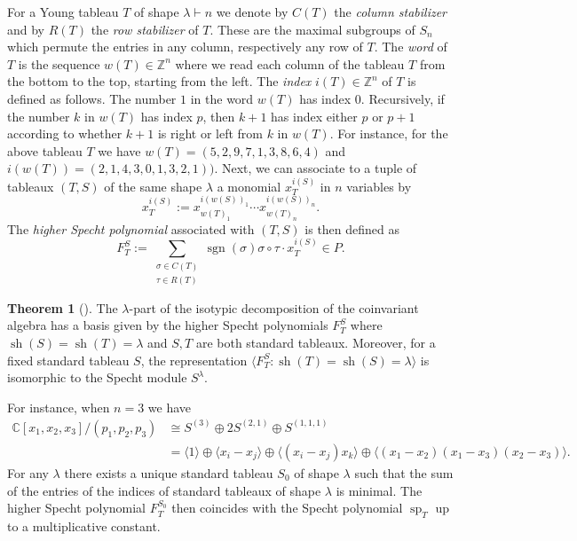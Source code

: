 \documentclass[11pt]{amsart}
\theoremstyle{definition}
\newtheorem{theorem}{Theorem}[section]
\newcommand{\ZZ}{\mathbb{Z}}
\newcommand{\CC}{\mathbb{C}}
\DeclareMathOperator{\sh}{sh}
\DeclareMathOperator{\spe}{sp}
\DeclareMathOperator{\sgn}{sgn}
\begin{document}
For a Young tableau $T$ of shape $\lambda \vdash n$ we denote by $C(T)$ the \emph{column stabilizer} and by $R(T)$ the \emph{row stabilizer} of $T$. These are the maximal subgroups of $S_n$ which permute the entries in any column, respectively any row of $T$. 
The \emph{word} of $T$ is the sequence $w(T) \in \ZZ^n$ where we read each column of the tableau $T$ from the bottom to the top, starting from the left.
The \emph{index} $i(T) \in \ZZ^n$ of $T$ is defined as follows. The number $1$ in the word $w(T)$ has index $0$. Recursively, if the number $k$ in $w(T)$ has index $p$, then $k+1$ has index either $p$ or $p+1$ according to whether $k+1$ is right or left from $k$ in $w(T)$. For instance, for the above tableau $T$ we have $w(T)=(5,2,9,7,1,3,8,6,4)$ and $i(w(T))=(2,1,4,3,0,1,3,2,1))$.
Next, we can associate to a tuple of tableaux $(T,S)$ of the same shape $\lambda$ a monomial $x_T^{i(S)}$ in $n$ variables by
\begin{equation*}
    x_T^{i(S)} := x_{w(T)_1}^{i(w(S))_1} \cdots x_{w(T)_{n}}^{i(w(S))_{n}}.
\end{equation*}
The \emph{higher Specht polynomial} associated with $(T,S)$ is then defined as
$$F_{T}^S := \sum_{\substack{\sigma \in C(T)\\ \tau \in R(T)}} \sgn (\sigma) \sigma \circ \tau \cdot x_{T}^{i(S)} \in P.$$


\begin{theorem}[{\cite{Terasoma1993Higher}}]
The $\lambda$-part of the isotypic decomposition of the coinvariant algebra has a basis given by the higher Specht polynomials $F_T^S$ where $\sh(S) = \sh(T) = \lambda$ and $S,T$ are both standard tableaux. Moreover, for a fixed standard tableau $S$, the representation $\langle F_T^S : \sh(T) = \sh(S) = \lambda \rangle$ is isomorphic to the Specht module $S^{\lambda}$.
\end{theorem}

For instance, when $n=3$ we have 
\begin{align*}
  \CC[x_1,x_2,x_3]/(p_1,p_2,p_3) & \cong S^{(3)} \oplus 2 S^{(2,1)} \oplus S^{(1,1,1)} \\
  & = \langle 1 \rangle \oplus \langle x_i - x_j \rangle \oplus \langle (x_i-x_j)x_k \rangle \oplus \langle (x_1-x_2)(x_1-x_3)(x_2-x_3) \rangle.
\end{align*}
For any $\lambda$ there exists a unique standard tableau $S_0$ of shape $\lambda$ such that the sum of the entries of the indices of standard tableaux of shape $\lambda$ is minimal. The higher Specht polynomial $F_T^{S_0}$ then coincides with the Specht polynomial $\spe_T$ up to a multiplicative constant.
\end{document}
